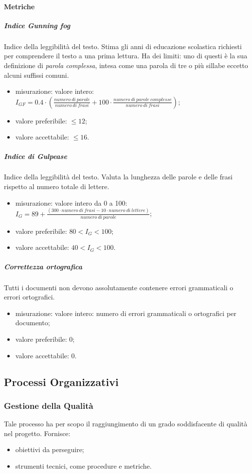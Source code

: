 		\paragraph{Metriche}
			\subparagraph{Indice Gunning fog}
			Indice della leggibilità del testo. Stima gli anni di educazione scolastica richiesti per comprendere il testo a una prima lettura.\newline
			Ha dei limiti: uno di questi è la sua definizione di \textit{parola complessa}, intesa come una parola di tre o più sillabe eccetto alcuni suffissi comuni.
			\begin{itemize}
				\item misurazione: valore intero: $ I_{GF} = 0.4 \cdot
				(
				\frac{numero\ di\ parole}{numero\ di\  frasi}
				+ 100 \cdot
				\frac{numero\ di\ parole\ complesse}{numero\ di\  frasi}
				) $;
				\item valore preferibile: $ \leq 12$;
				\item valore accettabile: $ \leq 16$.
			\end{itemize}
			\subparagraph{Indice di Gulpease}
			Indice della leggibilità del testo. Valuta la lunghezza delle parole e delle frasi rispetto al numero totale di lettere. 
			\begin{itemize}
				\item misurazione: valore intero da 0 a 100:\newline 	
				$I_G = 89+ \frac{(300 \cdot numero\ di\ frasi - 10 \cdot numero\ di\ lettere)}{numero\ di\ parole}$;	
				\item valore preferibile: $80 < I_G < 100$;
				\item valore accettabile: $40 < I_G < 100$.
			\end{itemize}
			\subparagraph{Correttezza ortografica}
			Tutti i documenti non devono assolutamente contenere errori grammaticali o errori ortografici. 
			\begin{itemize}
				\item misurazione: valore intero: numero di errori grammaticali o ortografici per documento;
				\item valore preferibile: 0;
				\item valore accettabile: 0.
			\end{itemize}
			
\subsection{Processi Organizzativi}
	\subsubsection{Gestione della Qualità}
	Tale processo ha per scopo il raggiungimento di un grado soddisfacente di qualità nel progetto. Fornisce:
	\begin{itemize}
		\item obiettivi da perseguire;
		\item strumenti tecnici, come procedure e metriche.
	\end{itemize}
